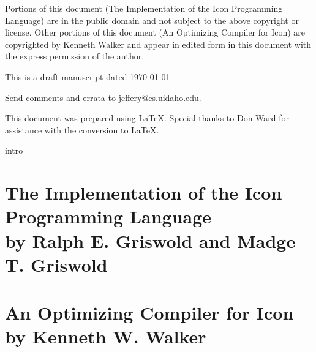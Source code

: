 \documentclass[letterpaper,twoside,12pt]{book}
\begin{document}
Portions of this document ({\textquotedbl}The Implementation of the
Icon Programming Language{\textquotedbl}) are in the public domain and
not subject to the above copyright or license. Other portions of this
document ({\textquotedbl}An Optimizing Compiler for
Icon{\textquotedbl}) are copyrighted by Kenneth Walker and appear in
edited form in this document with the express permission of the
author.


\bigskip
\raggedbottom

\noindent This is a draft manuscript dated \today.

\noindent Send comments and errata to
\href{mailto:jeffery@cs.uidaho.edu}{jeffery@cs.uidaho.edu}.

\bigskip

\noindent This document was prepared using \LaTeX. Special thanks to Don Ward
for assistance with the conversion to \LaTeX.

\setcounter{tocdepth}{4}
\tableofcontents


\mainmatter
 {intro}

%
\part[The Implementation of the Icon Programming Language]%
{The Implementation of the Icon Programming Language\\
{\large by Ralph E. Griswold and Madge T. Griswold}}















\part[An Optimizing Compiler for Icon]%
{An Optimizing Compiler for Icon\\{\large by Kenneth W. Walker}}
\end{document}
